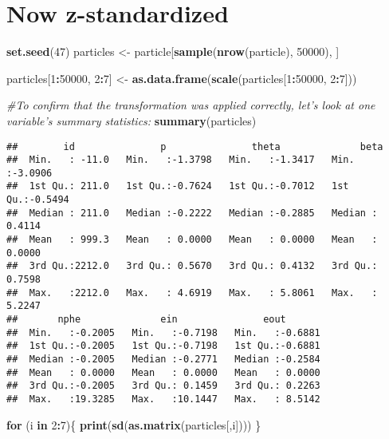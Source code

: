 \documentclass[
]{article}
\newenvironment{Shaded}{\begin{snugshade}}{\end{snugshade}}
\newcommand{\CommentTok}[1]{\textcolor[rgb]{0.56,0.35,0.01}{\textit{#1}}}
\newcommand{\ControlFlowTok}[1]{\textcolor[rgb]{0.13,0.29,0.53}{\textbf{#1}}}
\newcommand{\DecValTok}[1]{\textcolor[rgb]{0.00,0.00,0.81}{#1}}
\newcommand{\KeywordTok}[1]{\textcolor[rgb]{0.13,0.29,0.53}{\textbf{#1}}}
\newcommand{\NormalTok}[1]{#1}
\newcommand{\OperatorTok}[1]{\textcolor[rgb]{0.81,0.36,0.00}{\textbf{#1}}}
\newcommand{\StringTok}[1]{\textcolor[rgb]{0.31,0.60,0.02}{#1}}
\begin{document}
\hypertarget{now-z-standardized}{%
\section{Now z-standardized}\label{now-z-standardized}}

\begin{Shaded}
\begin{Highlighting}[]
\KeywordTok{set.seed}\NormalTok{(}\DecValTok{47}\NormalTok{)}
\NormalTok{particles <-}\StringTok{ }\NormalTok{particle[}\KeywordTok{sample}\NormalTok{(}\KeywordTok{nrow}\NormalTok{(particle), }\DecValTok{50000}\NormalTok{), ]}

\NormalTok{particles[}\DecValTok{1}\OperatorTok{:}\DecValTok{50000}\NormalTok{, }\DecValTok{2}\OperatorTok{:}\DecValTok{7}\NormalTok{] <-}\StringTok{ }\KeywordTok{as.data.frame}\NormalTok{(}\KeywordTok{scale}\NormalTok{(particles[}\DecValTok{1}\OperatorTok{:}\DecValTok{50000}\NormalTok{, }\DecValTok{2}\OperatorTok{:}\DecValTok{7}\NormalTok{]))}


\CommentTok{#To confirm that the transformation was applied correctly, let's look at one variable's summary statistics:}
\KeywordTok{summary}\NormalTok{(particles)}
\end{Highlighting}
\end{Shaded}

\begin{verbatim}
##        id               p               theta              beta        
##  Min.   : -11.0   Min.   :-1.3798   Min.   :-1.3417   Min.   :-3.0906  
##  1st Qu.: 211.0   1st Qu.:-0.7624   1st Qu.:-0.7012   1st Qu.:-0.5494  
##  Median : 211.0   Median :-0.2222   Median :-0.2885   Median : 0.4114  
##  Mean   : 999.3   Mean   : 0.0000   Mean   : 0.0000   Mean   : 0.0000  
##  3rd Qu.:2212.0   3rd Qu.: 0.5670   3rd Qu.: 0.4132   3rd Qu.: 0.7598  
##  Max.   :2212.0   Max.   : 4.6919   Max.   : 5.8061   Max.   : 5.2247  
##       nphe              ein               eout        
##  Min.   :-0.2005   Min.   :-0.7198   Min.   :-0.6881  
##  1st Qu.:-0.2005   1st Qu.:-0.7198   1st Qu.:-0.6881  
##  Median :-0.2005   Median :-0.2771   Median :-0.2584  
##  Mean   : 0.0000   Mean   : 0.0000   Mean   : 0.0000  
##  3rd Qu.:-0.2005   3rd Qu.: 0.1459   3rd Qu.: 0.2263  
##  Max.   :19.3285   Max.   :10.1447   Max.   : 8.5142
\end{verbatim}

\begin{Shaded}
\begin{Highlighting}[]
\ControlFlowTok{for}\NormalTok{ (i }\ControlFlowTok{in} \DecValTok{2}\OperatorTok{:}\DecValTok{7}\NormalTok{)\{}
  \KeywordTok{print}\NormalTok{(}\KeywordTok{sd}\NormalTok{(}\KeywordTok{as.matrix}\NormalTok{(particles[,i])))}
\NormalTok{\}}
\end{Highlighting}
\end{Shaded}
\end{document}
